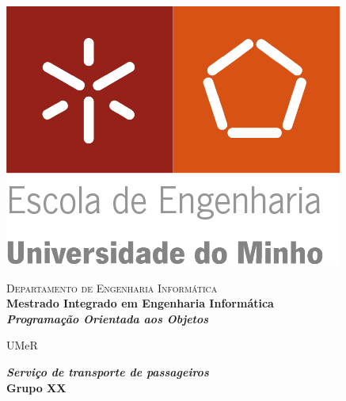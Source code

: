 \begin{titlepage}


\begin{minipage}{0.3\textwidth}
\begin{flushleft} 
\includegraphics[width=\textwidth]{logo.png}
\end{flushleft}
\end{minipage}
\begin{minipage}{0.6\textwidth}
\begin{flushright} 

\textsc{Departamento de Engenharia Informática}\\[0.1cm]
\bfseries Mestrado Integrado em Engenharia Informática \\ [0.1cm]
\bfseries \textit{Programação Orientada aos Objetos}\\[8mm]

\end{flushright}
\end{minipage}


\vspace{3cm}


\begin{center}


\LARGE UMeR

\Large \textbf{\textit{Serviço de transporte de passageiros}}\\[1.5cm]


{\Large \bfseries Grupo XX\\[2cm] }



\end{center}
\end{titlepage}
